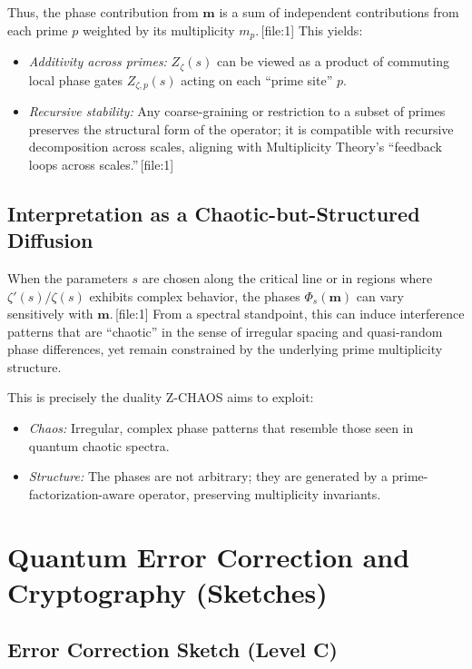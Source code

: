 \documentclass[11pt]{article}
\begin{document}
Thus, the phase contribution from \(\mathbf{m}\) is a sum of independent contributions from each prime \(p\) weighted by its multiplicity \(m_p\).\,[file:1] This yields:

\begin{itemize}[leftmargin=*]
    \item \emph{Additivity across primes:} \(Z_\zeta(s)\) can be viewed as a product of commuting local phase gates \(Z_{\zeta,p}(s)\) acting on each ``prime site'' \(p\).
    \item \emph{Recursive stability:} Any coarse-graining or restriction to a subset of primes preserves the structural form of the operator; it is compatible with recursive decomposition across scales, aligning with Multiplicity Theory's ``feedback loops across scales.''\,[file:1]
\end{itemize}

\subsection{Interpretation as a Chaotic-but-Structured Diffusion}

When the parameters \(s\) are chosen along the critical line or in regions where \(\zeta'(s)/\zeta(s)\) exhibits complex behavior, the phases \(\Phi_s(\mathbf{m})\) can vary sensitively with \(\mathbf{m}\).\,[file:1] From a spectral standpoint, this can induce interference patterns that are ``chaotic'' in the sense of irregular spacing and quasi-random phase differences, yet remain constrained by the underlying prime multiplicity structure.

This is precisely the duality Z-CHAOS aims to exploit:

\begin{itemize}[leftmargin=*]
    \item \emph{Chaos:} Irregular, complex phase patterns that resemble those seen in quantum chaotic spectra.
    \item \emph{Structure:} The phases are not arbitrary; they are generated by a prime-factorization-aware operator, preserving multiplicity invariants.
\end{itemize}

\section{Quantum Error Correction and Cryptography (Sketches)}
\label{sec:qec-crypto}

\subsection{Error Correction Sketch (Level C)}
\end{document}
